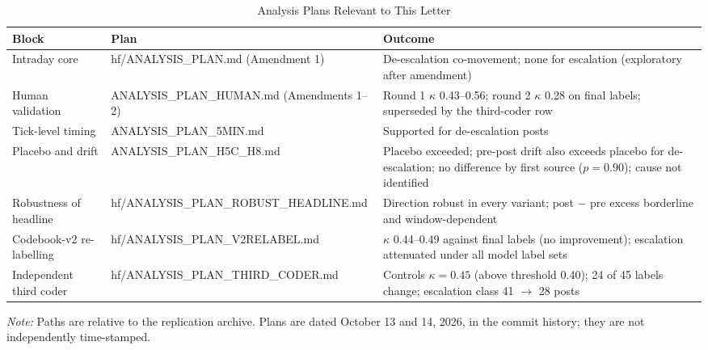 \documentclass[11pt]{article}
\begin{document}
\begin{table}[h]
\centering
\small
\caption{Analysis Plans Relevant to This Letter}
\label{tab:plans}
\begin{tabular}{p{3.6cm}p{5cm}p{6.4cm}}
\toprule
Block & Plan & Outcome \\
\midrule
Intraday core & hf/ANALYSIS\_PLAN.md (Amendment 1) & De-escalation co-movement; none for escalation (exploratory after amendment) \\
Human validation & ANALYSIS\_PLAN\_HUMAN.md (Amendments 1--2) & Round 1 $\kappa$ 0.43--0.56; round 2 $\kappa$ 0.28 on final labels; superseded by the third-coder row \\
Tick-level timing & ANALYSIS\_PLAN\_5MIN.md & Supported for de-escalation posts \\
Placebo and drift & ANALYSIS\_PLAN\_H5C\_H8.md & Placebo exceeded; pre-post drift also exceeds placebo for de-escalation; no difference by first source ($p = 0.90$); cause not identified \\
Robustness of headline & hf/ANALYSIS\_PLAN\_ROBUST\_HEADLINE.md & Direction robust in every variant; post $-$ pre excess borderline and window-dependent \\
Codebook-v2 re-labelling & hf/ANALYSIS\_PLAN\_V2RELABEL.md & $\kappa$ 0.44--0.49 against final labels (no improvement); escalation attenuated under all model label sets \\
Independent third coder & hf/ANALYSIS\_PLAN\_THIRD\_CODER.md & Controls $\kappa = 0.45$ (above threshold 0.40); 24 of 45 labels change; escalation class 41 $\to$ 28 posts \\
\bottomrule
\end{tabular}

\vspace{0.5em}
\begin{minipage}{0.95\textwidth}
\footnotesize\textit{Note:} Paths are relative to the replication archive. Plans are dated October 13 and 14, 2026, in the commit history; they are not independently time-stamped.
\end{minipage}
\end{table}

\clearpage


\end{document}
